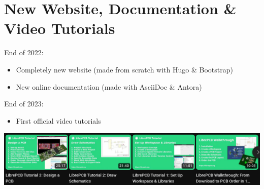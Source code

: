 \section{New Website, Documentation \& Video Tutorials}

\begin{frame}{\secname}
  End of 2022:
  \begin{itemize}
    \item Completely new website (made from scratch with Hugo \& Bootstrap)
    \item New online documentation (made with AsciiDoc \& Antora)
  \end{itemize}

  End of 2023:
  \begin{itemize}
    \item First official video tutorials
  \end{itemize}
  \includegraphics[width=\linewidth]{images/youtube.png}
\end{frame}

